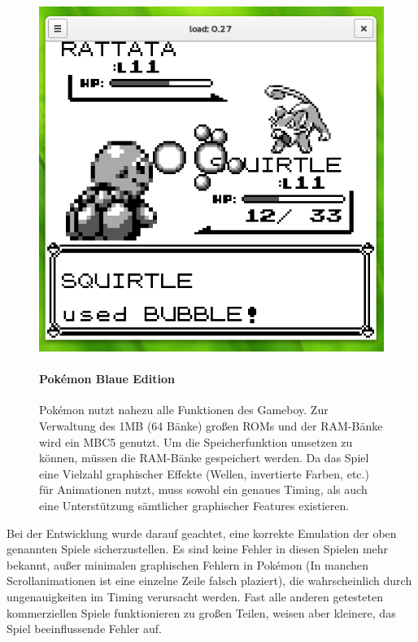 \documentclass[a4paper]{scrartcl}
\begin{document}
\begin{figure}[H]
  \includegraphics[width=\linewidth]{img/pokemon}
\endminipage\hfill
{}
  \paragraph{Pokémon Blaue Edition}
  Pokémon nutzt nahezu alle Funktionen des Gameboy. Zur Verwaltung des 1MB (64 Bänke) großen ROMs und der RAM-Bänke wird ein MBC5 genutzt. Um die Speicherfunktion umsetzen zu können, müssen die RAM-Bänke gespeichert werden. Da das Spiel eine Vielzahl graphischer Effekte (Wellen, invertierte Farben, etc.) für Animationen nutzt, muss sowohl ein genaues Timing, als auch eine Unterstützung sämtlicher graphischer Features existieren.
\endminipage
\end{figure}

Bei der Entwicklung wurde darauf geachtet, eine korrekte Emulation der oben genannten Spiele sicherzustellen. Es sind keine Fehler in diesen Spielen mehr bekannt, außer minimalen graphischen Fehlern in Pokémon (In manchen Scrollanimationen ist eine einzelne Zeile falsch plaziert), die wahrscheinlich durch ungenauigkeiten im Timing verursacht werden. Fast alle anderen getesteten kommerziellen Spiele funktionieren zu großen Teilen, weisen aber kleinere, das Spiel beeinflussende Fehler auf.
\end{document}
